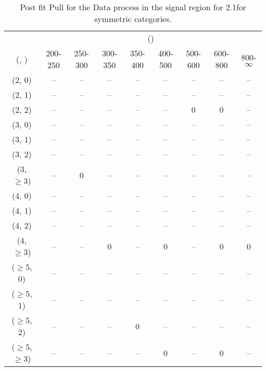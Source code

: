 \begin{table}[h!]
\tiny
\centering
\caption{Post fit Pull for the Data process in the signal region for 2.1\ifb for symmetric categories.\label{tab:pullseppost_sig_data_sym}}
\begin{tabular}
{ccccccccc}
	\hline\hline
	& \multicolumn{8}{c}{\scalht (\gev)} \\ 
	 (\njet,  \nb) & 200-250 & 250-300 & 300-350 & 350-400 & 400-500 & 500-600 & 600-800 & 800-$\infty$ \\ [0.8ex] 
\hline
	(2, 0) & -- & -- & -- & -- & -- & -- & -- & -- \\[0.5ex] 
	(2, 1) & -- & -- & -- & -- & -- & -- & -- & -- \\[0.5ex] 
	(2, 2) & -- & -- & -- & -- & -- & 0 & 0 & -- \\[0.5ex] 
	(3, 0) & -- & -- & -- & -- & -- & -- & -- & -- \\[0.5ex] 
	(3, 1) & -- & -- & -- & -- & -- & -- & -- & -- \\[0.5ex] 
	(3, 2) & -- & -- & -- & -- & -- & -- & -- & -- \\[0.5ex] 
	(3, $\ge3$) & -- & 0 & -- & -- & -- & -- & -- & -- \\[0.5ex] 
	(4, 0) & -- & -- & -- & -- & -- & -- & -- & -- \\[0.5ex] 
	(4, 1) & -- & -- & -- & -- & -- & -- & -- & -- \\[0.5ex] 
	(4, 2) & -- & -- & -- & -- & -- & -- & -- & -- \\[0.5ex] 
	(4, $\ge3$) & -- & -- & 0 & -- & 0 & -- & 0 & 0 \\[0.5ex] 
	($\ge5$, 0) & -- & -- & -- & -- & -- & -- & -- & -- \\[0.5ex] 
	($\ge5$, 1) & -- & -- & -- & -- & -- & -- & -- & -- \\[0.5ex] 
	($\ge5$, 2) & -- & -- & -- & 0 & -- & -- & -- & -- \\[0.5ex] 
	($\ge5$, $\ge3$) & -- & -- & -- & -- & 0 & -- & 0 & -- \\[0.5ex] 
	\hline
	\hline
\end{tabular}
\end{table}
